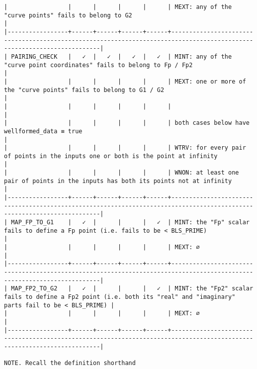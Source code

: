 \documentclass[varwidth=\maxdimen,margin=0.5cm,multi={verbatim}]{standalone}
\begin{document}
\begin{verbatim}
|                 |      |      |      |      | MEXT: any of the "curve points" fails to belong to G2                                                                  |
|-----------------+------+------+------+------+------------------------------------------------------------------------------------------------------------------------|
| PAIRING_CHECK   |   ✓  |   ✓  |   ✓  |   ✓  | MINT: any of the "curve point coordinates" fails to belong to Fp / Fp2                                                 |
|                 |      |      |      |      | MEXT: one or more of the "curve points" fails to belong to G1 / G2                                                     |
|                 |      |      |      |      |                                                                                                                        |
|                 |      |      |      |      | both cases below have wellformed_data ≡ true                                                                           |
|                 |      |      |      |      | WTRV: for every pair of points in the inputs one or both is the point at infinity                                      |
|                 |      |      |      |      | WNON: at least one pair of points in the inputs has both its points not at infinity                                    |
|-----------------+------+------+------+------+------------------------------------------------------------------------------------------------------------------------|
| MAP_FP_TO_G1    |   ✓  |      |      |   ✓  | MINT: the "Fp" scalar fails to define a Fp point (i.e. fails to be < BLS_PRIME)                                        |
|                 |      |      |      |      | MEXT: ∅                                                                                                                |
|-----------------+------+------+------+------+------------------------------------------------------------------------------------------------------------------------|
| MAP_FP2_TO_G2   |   ✓  |      |      |   ✓  | MINT: the "Fp2" scalar fails to define a Fp2 point (i.e. both its "real" and "imaginary" parts fail to be < BLS_PRIME) |
|                 |      |      |      |      | MEXT: ∅                                                                                                                |
|-----------------+------+------+------+------+------------------------------------------------------------------------------------------------------------------------|

NOTE. Recall the definition shorthand


\end{verbatim}
\end{document}

